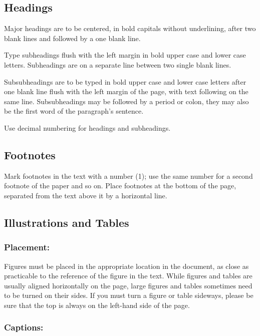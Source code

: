\documentclass{isprs} %
\begin{document}
\subsection{Headings}\label{sec:Headings}

Major headings are to be centered, in bold capitals without 
underlining, after two blank lines and followed by a one blank line.

Type subheadings flush with the left margin in bold upper case and lower 
case letters. Subheadings are on a separate line between two single blank lines.

Subsubheadings are to be typed in bold upper case and lower case letters 
after one blank line flush with the left margin of the page, with text 
following on the same line. Subsubheadings may be followed by a period 
or colon, they may also be the first word of the paragraph's sentence.

Use decimal numbering for headings and subheadings.


\subsection{Footnotes}\label{sec:Footnotes}

Mark footnotes in the text with a number (1); use the same number for a 
second footnote of the paper and so on. Place footnotes at the bottom of 
the page, separated from the text above it by a horizontal line.


\subsection{Illustrations and Tables}\label{sec:Illustrations and Tables}

\subsubsection{Placement:}\label{sec:Placement}

Figures must be placed in the appropriate location in the document, 
as close as practicable to the reference of the figure in the text. 
While figures and tables are usually aligned horizontally on the page, 
large figures and tables sometimes need to be turned on their sides. 
If you must turn a figure or table sideways, please be sure that the 
top is always on the left-hand side of the page.


\subsubsection{Captions:}\label{sec:Captions}
\end{document}
